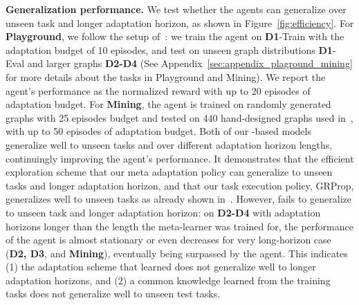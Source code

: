 \documentclass{article} \usepackage{iclr2020_conference,times}
\newcommand{\tb}{\textbf}
\begin{document}
\textbf{Generalization performance.}
We test whether the agents can generalize over unseen task and longer adaptation horizon, as shown in Figure~\ref{fig:efficiency}.
For \tb{Playground},
we follow the setup of~\citep{sohn2018hierarchical}: we train the agent on \tb{D1}-Train with the adaptation budget of 10 episodes,
and test on unseen graph distributions \tb{D1}-Eval and larger graphs \tb{D2-D4} (See Appendix~\ref{sec:appendix_plaground_mining} for more details about the tasks in Playground and Mining).
We report the agent's performance as the normalized reward with up to 20 episodes of adaptation budget.
For \tb{Mining}, the agent is trained on randomly generated graphs with 25 episodes budget and tested on 440 hand-designed graphs
used in~\citep{sohn2018hierarchical}, with up to 50 episodes of adaptation budget.
Both of our \NSGI-based models generalize well to unseen tasks and
over different adaptation horizon lengths,
continuingly improving the agent's performance.
It demonstrates that the efficient exploration scheme that our meta adaptation policy can generalize to unseen tasks and longer adaptation horizon, and that our task execution policy, GRProp, generalizes well to unseen tasks
as already shown in~\citep{sohn2018hierarchical}.
However, \RLSquare fails to generalize to unseen task and longer adaptation horizon:
on \tb{D2-D4} with adaptation horizons longer than the length the meta-learner was trained for,
the performance of the \RLSquare agent is almost stationary
or even decreases for very long-horizon case (\tb{D2, D3}, and \tb{Mining}),
eventually being surpassed by the \HRL agent.
This indicates (1) the adaptation scheme that \RLSquare learned does not generalize well to longer adaptation horizons,
and (2) a common knowledge learned from the training tasks does not generalize well to unseen test tasks.
\end{document}
